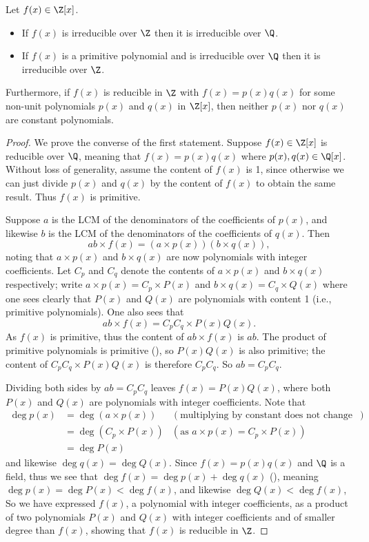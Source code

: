 \begin{theorem}\label{thrm-irreducible-over-Z-means-irreducible-over-Q}
    Let $f(x) \in \Z[x]$.
    \begin{itemize}
        \item If $f(x)$ is irreducible over $\Z$ then it is irreducible over $\Q$.
        \item If $f(x)$ is a primitive polynomial and is irreducible over $\Q$ then it is irreducible over $\Z$.
    \end{itemize}
    Furthermore, if $f(x)$ is reducible in $\Z$ with $f(x) = p(x)q(x)$ for some non-unit polynomials $p(x)$ and $q(x)$ in $\Z[x]$, then neither $p(x)$ nor $q(x)$ are constant polynomials.
\end{theorem}
\begin{proof}
    We prove the converse of the first statement. Suppose $f(x) \in \Z[x]$ is reducible over $\Q$, meaning that $f(x) = p(x)q(x)$ where $p(x), q(x) \in \Q[x]$. Without loss of generality, assume the content of $f(x)$ is 1, since otherwise we can just divide $p(x)$ and $q(x)$ by the content of $f(x)$ to obtain the same result. Thus $f(x)$ is primitive.

    Suppose $a$ is the LCM of the denominators of the coefficients of $p(x)$, and likewise $b$ is the LCM of the denominators of the coefficients of $q(x)$. Then
    \[
        ab\times f(x) = (a\times p(x))(b\times q(x)),
    \]
    noting that $a\times p(x)$ and $b\times q(x)$ are now polynomials with integer coefficients. Let $C_p$ and $C_q$ denote the contents of $a \times p(x)$ and $b \times q(x)$ respectively; write $a\times p(x) = C_p\times P(x)$ and $b \times q(x) = C_q\times Q(x)$ where one sees clearly that $P(x)$ and $Q(x)$ are polynomials with content 1 (i.e., primitive polynomials). One also sees that
    \[
        ab \times f(x) = C_pC_q \times P(x)Q(x).
    \]
    As $f(x)$ is primitive, thus the content of $ab \times f(x)$ is $ab$. The product of primitive polynomials is primitive (), so $P(x)Q(x)$ is also primitive; the content of $C_pC_q \times P(x)Q(x)$ is therefore $C_pC_q$. So $ab = C_pC_q$.
    
    Dividing both sides by $ab = C_pC_q$ leaves $f(x) = P(x)Q(x)$, where both $P(x)$ and $Q(x)$ are polynomials with integer coefficients. Note that
    \begin{align*}
        \deg p(x) &= \deg (a\times p(x)) & (\text{multiplying by constant does not change degree})\\
        &= \deg(C_p\times P(x)) & (\text{as } a\times p(x) = C_p\times P(x))\\
        &= \deg P(x)
    \end{align*}
    and likewise $\deg q(x) = \deg Q(x)$. Since $f(x) = p(x)q(x)$ and $\Q$ is a field, thus we see that $\deg f(x) = \deg p(x) + \deg q(x)$ (), meaning $\deg p(x) = \deg P(x) < \deg f(x)$, and likewise $\deg Q(x) < \deg f(x)$, So we have expressed $f(x)$, a polynomial with integer coefficients, as a product of two polynomials $P(x)$ and $Q(x)$ with integer coefficients and of smaller degree than $f(x)$, showing that $f(x)$ is reducible in $\Z$.


\end{proof}
